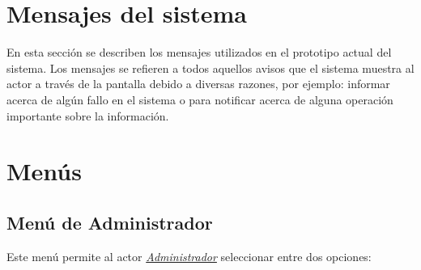 \section{Mensajes del sistema}

En esta sección se describen los mensajes utilizados en el prototipo actual del sistema. Los mensajes
se refieren a todos aquellos avisos que el sistema muestra al actor a través de la pantalla debido a diversas razones, por ejemplo: informar acerca de algún fallo en el sistema o para notificar acerca de alguna operación importante sobre la información.
































\section{Menús}

\subsection{Menú de Administrador}
 
 Este menú permite al actor {\em {\hyperlink{admin}{Administrador}}} seleccionar entre dos opciones:
 
